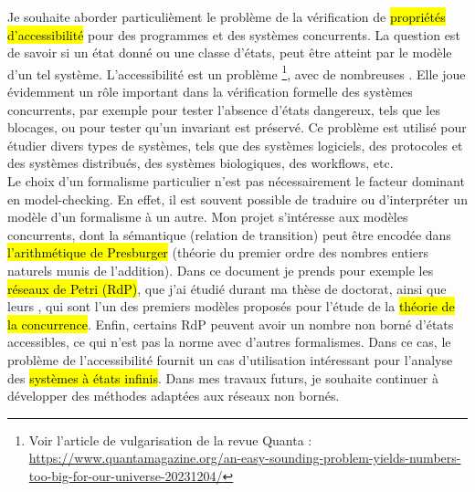 Je souhaite aborder particulièment le problème de la vérification de
\hl{propriétés d'accessibilité} pour des programmes et des systèmes concurrents.
La question est de savoir si un état donné ou une classe d'états, peut être
atteint par le modèle d'un tel système. L'accessibilité est un problème
\footnote{Voir l'article de vulgarisation de la
revue Quanta :\\
\url{https://www.quantamagazine.org/an-easy-sounding-problem-yields-numbers-too-big-for-our-universe-20231204/}},
avec de nombreuses . Elle joue évidemment un rôle
important dans la vérification formelle des systèmes concurrents, par exemple
pour tester l'absence \og d'états dangereux\fg, tels que les blocages, ou pour
tester qu'un invariant est préservé. Ce problème est utilisé pour étudier divers
types de systèmes, tels que des systèmes
logiciels,
des protocoles et des systèmes distribués, des systèmes
biologiques, des
workflows, etc.\\

Le choix d'un formalisme particulier n'est pas nécessairement le facteur
dominant en model-checking. En effet, il est souvent possible de traduire ou
d'interpréter un modèle d'un formalisme à un autre. Mon projet s'intéresse aux
modèles concurrents, dont la sémantique (relation de transition) peut être
encodée dans \hl{l'arithmétique de Presburger} (théorie du premier ordre des
nombres entiers naturels munis de l'addition). Dans ce document je prends pour
exemple les \hl{réseaux de Petri (RdP)}, que j'ai étudié durant ma thèse de
doctorat, ainsi que leurs , qui sont l'un des premiers modèles
proposés pour l'étude de la \hl{théorie de la concurrence}. Enfin, certains RdP
peuvent avoir un nombre non borné d'états accessibles, ce qui n'est pas la norme
avec d'autres formalismes. Dans ce cas, le problème de l'accessibilité fournit
un cas d'utilisation intéressant pour l'analyse des \hl{systèmes à états
infinis}. Dans mes travaux futurs, je souhaite continuer à développer des
méthodes adaptées aux réseaux non bornés.\\



